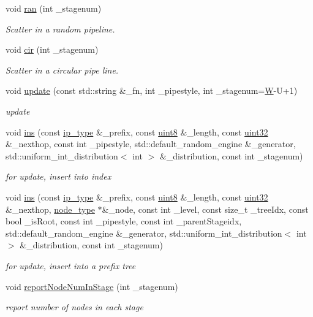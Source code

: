 \begin{DoxyCompactItemize}
void \hyperlink{classRPTree_acb0e9b9ead3919c98f96c9c7cc35f8da}{ran} (int \-\_\-stagenum)
\begin{DoxyCompactList}\small\item\em Scatter in a random pipeline. \end{DoxyCompactList}\item 
void \hyperlink{classRPTree_a629c63b87d095c68f5ce158f7a552219}{cir} (int \-\_\-stagenum)
\begin{DoxyCompactList}\small\item\em Scatter in a circular pipe line. \end{DoxyCompactList}\item 
void \hyperlink{classRPTree_a0ebe8ab1b3dc14c4b9c67d6127338553}{update} (const std\-::string \&\-\_\-fn, int \-\_\-pipestyle, int \-\_\-stagenum=\hyperlink{test__u128_8cpp_ab21b528bc38899d04d3a7053e52fb797}{W}-\/U+1)
\begin{DoxyCompactList}\small\item\em update \end{DoxyCompactList}\item 
void \hyperlink{classRPTree_a037860f8b9df460df3a90bea15500100}{ins} (const \hyperlink{classRPTree_a247a4b90a027365aa8cc94c69ba141d1}{ip\-\_\-type} \&\-\_\-prefix, const \hyperlink{types_8h_a34ecedcf03a70dc91e4616212d79267d}{uint8} \&\-\_\-length, const \hyperlink{types_8h_abd01e8e67e3d94cab04ecaaf4f85ac1b}{uint32} \&\-\_\-nexthop, const int \-\_\-pipestyle, std\-::default\-\_\-random\-\_\-engine \&\-\_\-generator, std\-::uniform\-\_\-int\-\_\-distribution$<$ int $>$ \&\-\_\-distribution, const int \-\_\-stagenum)
\begin{DoxyCompactList}\small\item\em for update, insert into index \end{DoxyCompactList}\item 
void \hyperlink{classRPTree_a63a9c253698eea48b7d411e5f4b92241}{ins} (const \hyperlink{classRPTree_a247a4b90a027365aa8cc94c69ba141d1}{ip\-\_\-type} \&\-\_\-prefix, const \hyperlink{types_8h_a34ecedcf03a70dc91e4616212d79267d}{uint8} \&\-\_\-length, const \hyperlink{types_8h_abd01e8e67e3d94cab04ecaaf4f85ac1b}{uint32} \&\-\_\-nexthop, \hyperlink{classRPTree_a9ebcf5a1e56890f2ab50a8a1c700c35f}{node\-\_\-type} $\ast$\&\-\_\-node, const int \-\_\-level, const size\-\_\-t \-\_\-tree\-Idx, const bool \-\_\-is\-Root, const int \-\_\-pipestyle, const int \-\_\-parent\-Stageidx, std\-::default\-\_\-random\-\_\-engine \&\-\_\-generator, std\-::uniform\-\_\-int\-\_\-distribution$<$ int $>$ \&\-\_\-distribution, const int \-\_\-stagenum)
\begin{DoxyCompactList}\small\item\em for update, insert into a prefix tree \end{DoxyCompactList}\item 
void \hyperlink{classRPTree_aa79f9c35f52653b96925e413484e796d}{report\-Node\-Num\-In\-Stage} (int \-\_\-stagenum)
\begin{DoxyCompactList}\small\item\em report number of nodes in each stage \end{DoxyCompactList}\end{DoxyCompactItemize}
